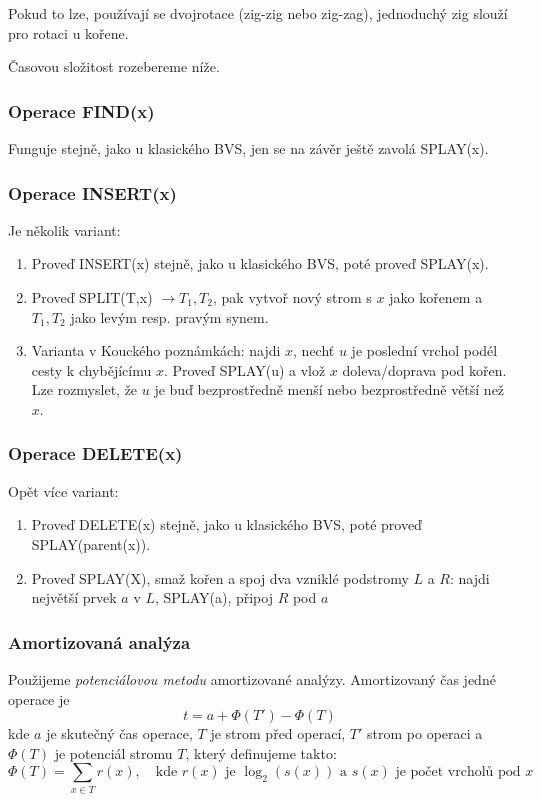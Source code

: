 \documentclass[11pt]{report} %
\numberwithin{equation}{section}
\begin{document}
Pokud to lze, používají se dvojrotace (zig-zig nebo zig-zag), jednoduchý zig slouží pro rotaci u kořene.

Časovou složitost rozebereme níže.

\subsubsection{Operace FIND(x)}
Funguje stejně, jako u klasického BVS, jen se na závěr ještě zavolá SPLAY(x). 

\subsubsection{Operace INSERT(x)}
Je několik variant:
\begin{enumerate}
	
	
	\item Proveď INSERT(x) stejně, jako u klasického BVS, poté proveď SPLAY(x).
	\item Proveď SPLIT(T,x) $\rightarrow T_1, T_2$, pak vytvoř nový strom s $x$ jako kořenem a $T_1, T_2$ jako levým resp. pravým synem.
	\item Varianta v Kouckého poznámkách: najdi $x$, nechť $u$ je poslední vrchol podél cesty k chybějícímu $x$. Proveď SPLAY(u) a vlož $x$ doleva/doprava pod kořen. Lze rozmyslet, že $u$ je buď bezprostředně menší nebo bezprostředně větší než $x$.
\end{enumerate}

\subsubsection{Operace DELETE(x)}
Opět více variant:
\begin{enumerate}
	
	
	\item Proveď DELETE(x) stejně, jako u klasického BVS, poté proveď SPLAY(parent(x)).
	\item Proveď SPLAY(X), smaž kořen a spoj dva vzniklé podstromy $L$ a $R$: najdi největší prvek $a$ v $L$, SPLAY(a), připoj $R$ pod $a$

\end{enumerate}

\subsubsection{Amortizovaná analýza}
Použijeme \textit{potenciálovou metodu} amortizované analýzy. Amortizovaný čas jedné operace je
$$t = a + \Phi(T') - \Phi(T)$$
kde $a$ je skutečný čas operace, $T$ je strom před operací, $T'$ strom po operaci a $\Phi(T)$ je potenciál stromu $T$, který definujeme takto:
$$\Phi(T) = \sum\limits_{x \in T} r(x), \quad \text{kde $r(x)$ je $\log_2(s(x))$ a $s(x)$ je počet vrcholů pod $x$} $$
\end{document}
